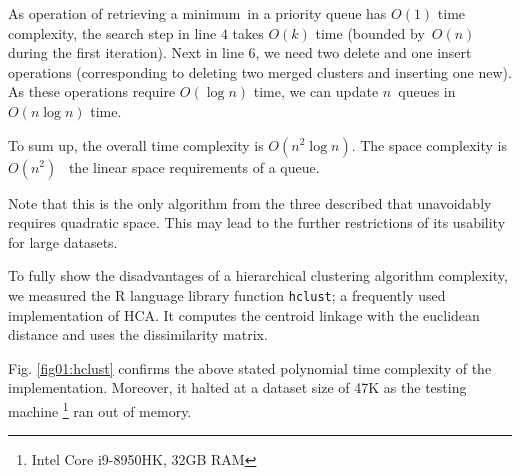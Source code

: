 \begin{description}
 	
 	As  operation of retrieving a minimum\ in a priority queue has $O(1)$ time complexity, the search step in line $4$ takes $O(k)$ time (bounded by~$O(n)$ during the first iteration). Next in line $6$, we need two delete and one insert operations (corresponding to deleting two merged clusters and inserting one new). As these operations require $O(\log{n})$ time, we can update $n$~queues in $O(n\log{n})$ time.
 	
 	To sum up, the overall time complexity is $O(n^2\log{n})$. The space complexity is  $O(n^2)$ \ the linear space requirements of a queue.
 	
 	\begin{rem}
 		Note that this is the only algorithm from the three described that unavoidably requires quadratic space. This may lead to the further restrictions of its usability for large datasets.
 	\end{rem}

\end{description}

To fully show the disadvantages of a hierarchical clustering algorithm complexity, we measured the R language library function \texttt{hclust}; a frequently used implementation of HCA. It computes the centroid linkage with the euclidean distance and uses the dissimilarity matrix. 

Fig. \ref{fig01:hclust} confirms the above stated polynomial time complexity of the implementation. Moreover, it halted at a dataset size of 47K as the testing machine \footnote{Intel Core i9-8950HK, 32GB RAM} ran out of memory.

